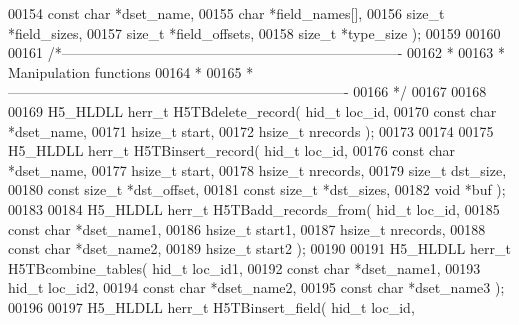 \begin{DoxyCode}
00154                            \textcolor{keyword}{const} \textcolor{keywordtype}{char} *dset\_name,
00155                            \textcolor{keywordtype}{char} *field\_names[],
00156                            \textcolor{keywordtype}{size\_t} *field\_sizes,
00157                            \textcolor{keywordtype}{size\_t} *field\_offsets,
00158                            \textcolor{keywordtype}{size\_t} *type\_size );
00159 
00160 
00161 \textcolor{comment}{/*-------------------------------------------------------------------------}
00162 \textcolor{comment}{ *}
00163 \textcolor{comment}{ * Manipulation functions}
00164 \textcolor{comment}{ *}
00165 \textcolor{comment}{ *-------------------------------------------------------------------------}
00166 \textcolor{comment}{ */}
00167 
00168 
00169 H5\_HLDLL herr\_t  H5TBdelete\_record( hid\_t loc\_id,
00170                           \textcolor{keyword}{const} \textcolor{keywordtype}{char} *dset\_name,
00171                           hsize\_t start,
00172                           hsize\_t nrecords );
00173 
00174 
00175 H5\_HLDLL herr\_t  H5TBinsert\_record( hid\_t loc\_id,
00176                           \textcolor{keyword}{const} \textcolor{keywordtype}{char} *dset\_name,
00177                           hsize\_t start,
00178                           hsize\_t nrecords,
00179                           \textcolor{keywordtype}{size\_t} dst\_size,
00180                           \textcolor{keyword}{const} \textcolor{keywordtype}{size\_t} *dst\_offset,
00181                           \textcolor{keyword}{const} \textcolor{keywordtype}{size\_t} *dst\_sizes,
00182                           \textcolor{keywordtype}{void} *buf );
00183 
00184 H5\_HLDLL herr\_t  H5TBadd\_records\_from( hid\_t loc\_id,
00185                              \textcolor{keyword}{const} \textcolor{keywordtype}{char} *dset\_name1,
00186                              hsize\_t start1,
00187                              hsize\_t nrecords,
00188                              \textcolor{keyword}{const} \textcolor{keywordtype}{char} *dset\_name2,
00189                              hsize\_t start2 );
00190 
00191 H5\_HLDLL herr\_t  H5TBcombine\_tables( hid\_t loc\_id1,
00192                            \textcolor{keyword}{const} \textcolor{keywordtype}{char} *dset\_name1,
00193                            hid\_t loc\_id2,
00194                            \textcolor{keyword}{const} \textcolor{keywordtype}{char} *dset\_name2,
00195                            \textcolor{keyword}{const} \textcolor{keywordtype}{char} *dset\_name3 );
00196 
00197 H5\_HLDLL herr\_t  H5TBinsert\_field( hid\_t loc\_id,

\end{DoxyCode}
